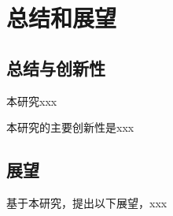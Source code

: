 \chapter{总结和展望}
\label{chap:conclusion}

\section{总结与创新性}

本研究xxx

本研究的主要创新性是xxx

\section{展望}

基于本研究，提出以下展望，xxx

